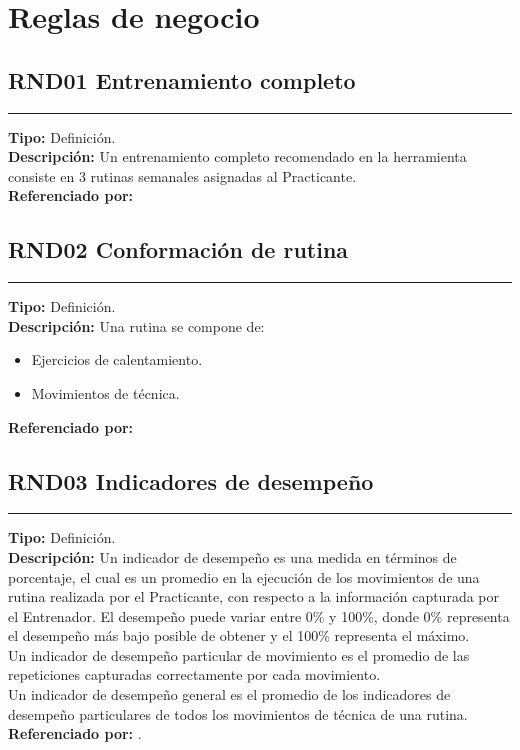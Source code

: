 \section{Reglas de negocio} 


\subsection{\normalsize{\textcolor[rgb]{0, 0, 0.545098}{RND01 Entrenamiento completo}}}
\label{rn:RND01}
\rule[3mm]{16.59cm}{0.1mm} \vspace{1mm}
\textbf{Tipo:} Definición.\\
\textbf{Descripción:} Un entrenamiento completo recomendado en la herramienta consiste en 3 rutinas semanales asignadas al Practicante.\\
\textbf{Referenciado por: }  \\

\subsection{\normalsize{\textcolor[rgb]{0, 0, 0.545098}{RND02 Conformación de rutina}}}
\label{rn:RND02}
\rule[3mm]{16.59cm}{0.1mm} \vspace{1mm}
\textbf{Tipo:} Definición.\\
\textbf{Descripción:} Una rutina se compone de:
\begin{itemize} \itemsep1pt \parskip0pt 
	\item Ejercicios de calentamiento.
	\item Movimientos de técnica.
\end{itemize}
\textbf{Referenciado por: }  \\

\subsection{\normalsize{\textcolor[rgb]{0, 0, 0.545098}{RND03 Indicadores de desempeño}}}
\label{rn:RND03}
\rule[3mm]{16.59cm}{0.1mm} \vspace{1mm}
\textbf{Tipo:} Definición.\\
\textbf{Descripción:} Un indicador de desempeño es una medida en términos de porcentaje, el cual es un promedio en la ejecución de los movimientos de una rutina realizada por el Practicante, con respecto a la información capturada por el Entrenador. El desempeño puede variar entre 0\% y 100\%, donde 0\% representa el desempeño más bajo posible de obtener y el 100\% representa el máximo.\\
Un indicador de desempeño particular de movimiento es el promedio de las repeticiones capturadas correctamente por cada movimiento.\\
Un indicador de desempeño general es el promedio de los indicadores de desempeño particulares de todos los movimientos de técnica de una rutina.\\
\textbf{Referenciado por: } .\\


